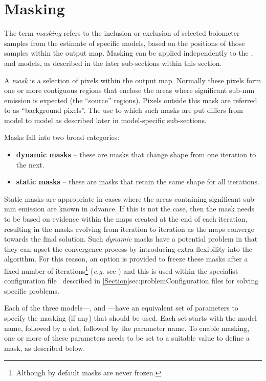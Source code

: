 \section{Masking}
\label{sec:masking}

The term \emph{masking} refers to the inclusion or exclusion of selected
bolometer samples from the estimate of specific models, based on the
positions of those samples within the output map. Masking can be applied
independently to the ,  and  models, as
described in the later sub-sections within this section.

A \emph{mask} is a selection of pixels within the output map. Normally
these pixels form one or more contiguous regions that enclose the areas
where significant sub-mm emission is expected (the ``source'' regions).
Pixels outside this mask are referred to as ``background pixels''. The use
to which such masks are put differs from model to model as described
later in model-specific sub-sections.

Masks fall into two broad categories:
\begin{itemize}

\item \textbf{dynamic masks} -- these are masks that change shape from one
iteration to the next.

\item \textbf{static masks} -- these are masks that retain the same shape
for all iterations.

\end{itemize}

Static masks are appropriate in cases where the areas containing significant
sub-mm emission are known in advance. If this is not the case, then the
mask needs to be based on evidence within the maps created at the end of
each iteration, resulting in the masks evolving from iteration to iteration
as the maps converge towards the final solution. Such \emph{dynamic} masks
have a potential problem  in that they can upset the convergence process by
introducing extra flexibility into the algorithm. For this reason, an
option is provided to freeze these masks after a fixed number of
iterations\footnote{Although by default masks are never frozen.}
(\emph{e.g.} see ) and this
is used within the specialist configuration file \fixconvergence\
described in \cref{Section}{sec:problem}{Configuration files for solving
specific problems}.

Each of the three models---,  and 
---have an equivalent set of parameters to specify the masking (if any)
that should be used. Each set starts with the model name, followed by a
dot, followed by the parameter name. To enable masking, one or more of
these parameters needs to be set to a suitable value to define a mask, as
described below.

